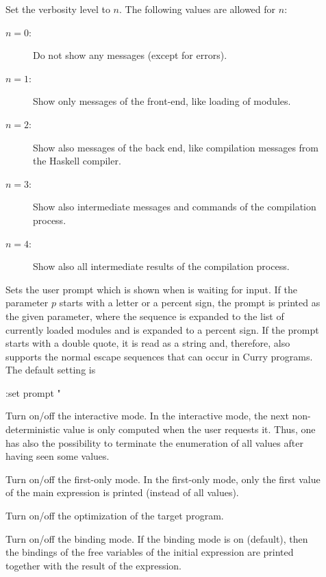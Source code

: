 \begin{description}
\item[]
Set the verbosity level to $n$. The following values are allowed
for $n$:
\begin{description}
\item[$n=0$:] Do not show any messages (except for errors).
\item[$n=1$:] Show only messages of the front-end, like loading
of modules.
\item[$n=2$:]
Show also messages of the back end, like compilation messages
from the Haskell compiler.
\item[$n=3$:]
Show also intermediate messages and commands of the compilation
process.
\item[$n=4$:]
Show also all intermediate results of the compilation process.
\end{description}

\item[]
Sets the user prompt which is shown when \CYS is waiting for input.
If the parameter $p$ starts with a letter or a percent sign,
the prompt is printed as the given parameter,
where the sequence  is expanded to the list of
currently loaded modules
and \ccode{\%\%} is expanded to a percent sign.
If the prompt starts with a double quote, it is read as a string and,
therefore, also supports the normal escape sequences that can occur
in Curry programs. The default setting is
\begin{curry}
:set prompt "%
\end{curry}

\item[]
Turn on/off the interactive mode.
In the interactive mode, the next non-deterministic value
is only computed when the user requests it.
Thus, one has also the possibility to terminate the
enumeration of all values after having seen some values.

\item[]
Turn on/off the first-only mode.
In the first-only mode, only the first value
of the main expression is printed (instead of all values).

\item[]
Turn on/off the optimization of the target program.

\item[]
Turn on/off the binding mode.
If the binding mode is on (default),
then the bindings of the free variables of the initial expression
are printed together with the result of the expression.


\end{description}
